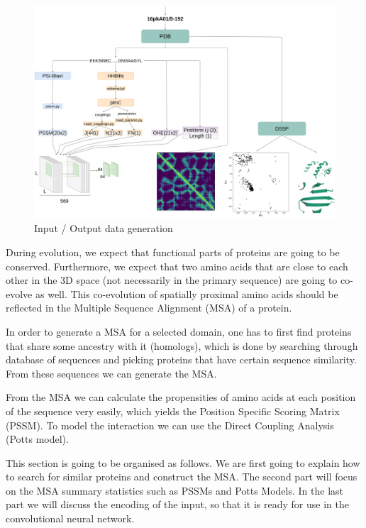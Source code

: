 \begin{figure}
    \centering
    \includegraphics[width=\linewidth]{imgs_tomas/pipeline_input.png}
    \caption{Input / Output data generation}
    \label{fig:pipeline_input}
\end{figure}

During evolution, we expect that functional parts of proteins are going to be conserved. 
Furthermore, we expect that two amino acids that are close to each other in the 3D space (not necessarily in the primary sequence) are going to co-evolve as well. 
This co-evolution of spatially proximal amino acids should be reflected in the Multiple Sequence Alignment (MSA) of a protein.

In order to generate a MSA for a selected domain, one has to first find proteins that share some ancestry with it (homologs), which is done by searching through database of sequences and picking proteins that have certain sequence similarity. 
From these sequences we can generate the MSA.
    
From the MSA we can calculate the propensities of amino acids at each position of the sequence very easily, which yields the Position Specific Scoring Matrix (PSSM). 
To model the interaction we can use the Direct Coupling Analysis (Potts model).
    
This section is going to be organised as follows. 
We are first going to explain how to search for similar proteins and construct the MSA. 
The second part will focus on the MSA summary statistics such as PSSMs and Potts Models. 
In the last part we will discuss the encoding of the input, so that it is ready for use in the convolutional neural network.
    

